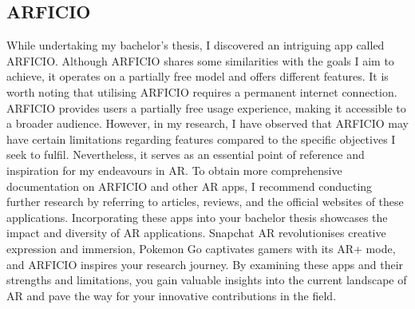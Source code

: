 \subsection*{ARFICIO}
While undertaking my bachelor's thesis, I discovered an intriguing app called ARFICIO. Although ARFICIO shares some similarities with the goals I aim to achieve, it operates on a partially free model and offers different features. It is worth noting that utilising ARFICIO requires a permanent internet connection.
ARFICIO provides users a partially free usage experience, making it accessible to a broader audience. However, in my research, I have observed that ARFICIO may have certain limitations regarding features compared to the specific objectives I seek to fulfil. Nevertheless, it serves as an essential point of reference and inspiration for my endeavours in \ac{AR}.
To obtain more comprehensive documentation on ARFICIO and other \ac{AR} apps, I recommend conducting further research by referring to articles, reviews, and the official websites of these applications.
Incorporating these apps into your bachelor thesis showcases the impact and diversity of \ac{AR} applications. Snapchat \ac{AR} revolutionises creative expression and immersion, Pokemon Go captivates gamers with its AR+ mode, and ARFICIO inspires your research journey. By examining these apps and their strengths and limitations, you gain valuable insights into the current landscape of \ac{AR} and pave the way for your innovative contributions in the field.